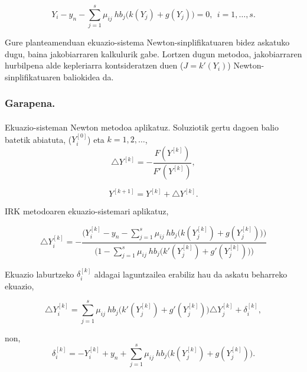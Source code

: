 \begin{equation*}
Y_{i}-y_n- \sum\limits_{j=1}^{s} \mu_{ij} \ hb_j \bigg(k(Y_{j})+g(Y_{j})\bigg)=0, \ \ i=1,\dots,s.
\end{equation*}

Gure planteamenduan ekuazio-sistema Newton-sinplifikatuaren bidez askatuko dugu, baina jakobiarraren kalkulurik gabe. Lortzen dugun metodoa, jakobiarraren hurbilpena alde kepleriarra kontsideratzen duen ($J=k'(Y_i)$) Newton-sinplifikatuaren baliokidea da. 

\subsubsection*{Garapena.}

\paragraph*{}Ekuazio-sisteman Newton metodoa aplikatuz. Soluziotik gertu dagoen balio batetik abiatuta, ($Y_i^{[0]}$) eta $k=1,2,\dots$, 
\begin{equation*}
\triangle Y^{[k]}=-\frac{F(Y^{[k]})}{F'(Y^{[k]})},
\end{equation*}

\begin{equation*}
Y^{[k+1]}=Y^{[k]}+\triangle Y^{[k]}.
\end{equation*}

IRK metodoaren ekuazio-sistemari aplikatuz,

\begin{equation*}
\triangle Y_i^{[k]}=-\frac{\big(Y_{i}^{[k]}-y_n- \sum\limits_{j=1}^{s} \mu_{ij} \ hb_j                               \big(k(Y_{j}^{[k]})+g(Y_{j}^{[k]})\big)\big)}
                          {\big(1-\sum\limits_{j=1}^{s} \mu_{ij} \ hb_j \big(k'(Y_{j}^{[k]})+g'(Y_{j}^{[k]})\big)\big)}
\end{equation*}

Ekuazio laburtzeko $\delta_i^{[k]}$ aldagai laguntzailea erabiliz hau da askatu beharreko ekuazio,

\begin{equation}
\triangle Y_i^{[k]}=\sum\limits_{j=1}^{s} \mu_{ij} \ hb_j \big(k'(Y_{j}^{[k]})+g'(Y_{j}^{[k]})\big)\triangle Y_j^{[k]}+\delta_i^{[k]},
\end{equation}

non,
\begin{equation*}
\delta_i^{[k]}=-Y_{i}^{[k]}+y_n+ \sum\limits_{j=1}^{s} \mu_{ij} \ hb_j \big(k(Y_{j}^{[k]})+g(Y_{j}^{[k]})\big).
\end{equation*}

